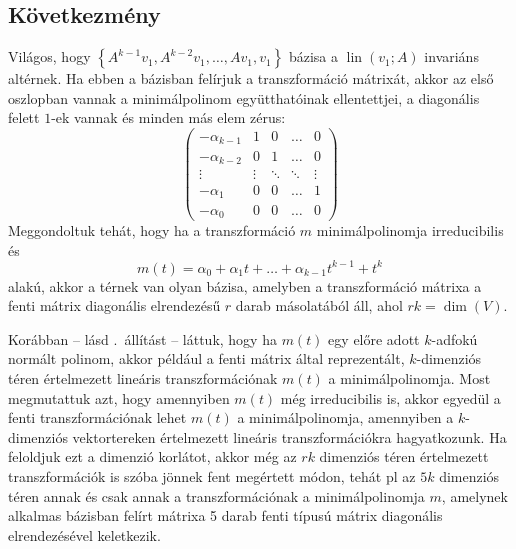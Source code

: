 \documentclass[9pt, a4paper, showtrims]{memoir}
\theoremstyle{plain}
\theoremstyle{remark}
\theoremstyle{definition}
\DeclareMathOperator{\lin}{lin}
\begin{document}
\subsection{Következmény}
Világos, hogy
\(
\left\{
A^{k-1}v_1, A^{k-2}v_1,\ldots,Av_1,v_1
\right\}
\)
bázisa a $\lin( v_1;A)$
invariáns altérnek.
Ha ebben a bázisban felírjuk a transzformáció mátrixát,
akkor az első oszlopban vannak a minimálpolinom együtthatóinak ellentettjei,
a diagonális felett $1$-ek vannak és minden más elem zérus:
\[
	\begin{pmatrix}
		-\alpha_{k-1} & 1      & 0      & \dots  & 0      \\
		-\alpha_{k-2} & 0      & 1      & \dots  & 0      \\
		\vdots        & \vdots & \ddots & \ddots & \vdots \\
		-\alpha_{1}   & 0      & 0      & \dots  & 1      \\
		-\alpha_{0}   & 0      & 0      & \dots  & 0
	\end{pmatrix}
\]
Meggondoltuk tehát, hogy ha a transzformáció $m$ minimálpolinomja irreducibilis és
\[m\left( t \right)
	=\alpha_0+\alpha_1t+\dots+\alpha_{k-1}t^{k-1}+t^k
\]
alakú, akkor a térnek van olyan bázisa, amelyben a transzformáció mátrixa a fenti mátrix
diagonális elrendezésű $r$ darab másolatából áll, ahol $rk=\dim(V)$.

Korábban -- lásd .~állítást -- láttuk, 
hogy ha $m\left( t \right)$ egy előre adott $k$-adfokú normált polinom,
akkor például a fenti mátrix által reprezentált,
$k$-dimenziós téren értelmezett lineáris transzformációnak $m\left( t \right)$
a minimálpolinomja. 
Most megmutattuk azt, hogy amennyiben $m\left( t \right)$ még irreducibilis is, 
akkor egyedül a fenti transzformációnak lehet $m\left( t \right)$ a minimálpolinomja,
amennyiben a $k$-dimenziós vektortereken értelmezett lineáris transzformációkra hagyatkozunk.
Ha feloldjuk ezt a dimenzió korlátot, akkor még az $rk$ dimenziós téren értelmezett transzformációk is szóba jönnek
fent megértett módon, tehát pl az $5k$ dimenziós téren annak és csak annak a transzformációnak a minimálpolinomja $m$,
amelynek alkalmas bázisban felírt mátrixa 5 darab fenti típusú mátrix diagonális elrendezésével keletkezik.

\end{document}
